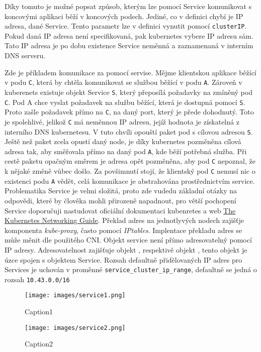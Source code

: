 Díky tomuto je možné popsat způsob, kterým lze pomocí Service komunikovat s koncovými aplikaci běží v koncových podech. Jediné, co v definici chybí je IP adresa, dané Service. Tento parametr lze v definici vynutit pomocí \verb|clusterIP|. Pokud daná IP adresa není specifikovaná, pak kubernetes vybere IP adresu sám. Tato IP adresa je po dobu existence Service neměnná a zaznamenaná v interním DNS serveru.  

Zde je příkladem komunikace za pomocí servise. Mějme klientskou aplikace běžící v podu \verb|C|, která by chtěla komunikovat se službou běžící v podu \verb|A|. Zároveň v kuberenets existuje objekt Service \verb|S|, který přeposílá požadavky na zmíněný pod \verb|C|. Pod A chce vyslat požadavek na službu běžící, která je dostupná pomocí \verb|S|. Proto zašle požadavek přímo na \verb|C|, na daný port, který je přede dohodnutý. Toto je spolehlivé, jelikož \verb|C| má neměnnou IP adresu, jejíž hodnota je získatelná z interního DNS kubernetesu. V tuto chvíli opouští paket pod s cílovou adresou \verb|S|. Ještě než paket zcela opustí daný node, je díky kubernetes pozměněna cílová adresa tak, aby směřovala přímo na daný pod \verb|A|, kde běží potřebná služba. Při cestě paketu opačným směrem je adresa opět pozměněna, aby pod \verb|C| nepoznal, že k nějaké změně vůbec došlo. Za povšimnutí stojí, že klientský pod \verb|C| nemusí nic o existenci podu \verb|A| vědět, celá komunikace je abstrahována prostřednictvím service. Problematika Service je velmi složitá, proto zde vudedu základní otázky na odpovědi, které by člověka mohli přirozeně napadnout, pro větší pochopení Service doporučuji nastudovat oficiální dokumentaci kubenretes a web \href{https://www.tkng.io/}{The Kubernetes Networking Guide}. Překlad adres na jednotlyvých nodech zajišťje komponenta \textit{kube-proxy}, často pomocí \textit{IPtables}. Implentace překladu adres se může měnit dle použitého CNI. Objekt service není přímo adresovatelný pomocí IP adresy. Adresovatelnost zajišťuje objekt , respektivě objekt , tento objekt je úzce spojen s objektem Service. Rozsah defaultně přidělovaných IP adres pro Services je uchován v  proměnné \verb|service_cluster_ip_range|, defaultně se jedná o rozsah \verb|10.43.0.0/16|\cite{suserancher_2023_rancher}



\begin{figure}[!ht]
    \centering
    \texttt{[image: images/service1.png]}
    \caption{Caption1}
    \label{fig:service1}
    \cite{betz_2017}
\end{figure}
\begin{figure}[!ht]
    \centering
    \texttt{[image: images/service2.png]}
    \caption{Caption2}
    \label{fig:service2}
    \cite{betz_2017}
\end{figure}

